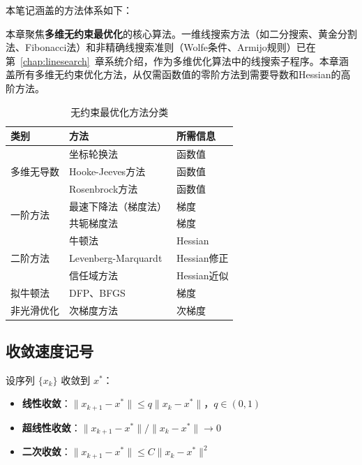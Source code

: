 本笔记涵盖的方法体系如下：

\begin{notebox}[关于方法分类]
本章聚焦\textbf{多维无约束最优化}的核心算法。一维线搜索方法（如二分搜索、黄金分割法、Fibonacci法）和非精确线搜索准则（Wolfe条件、Armijo规则）已在第~\ref{chap:linesearch}~章系统介绍，作为多维优化算法中的线搜索子程序。本章涵盖所有多维无约束优化方法，从仅需函数值的零阶方法到需要导数和Hessian的高阶方法。
\end{notebox}


\begin{table}[H]
\centering
\caption{无约束最优化方法分类}
\begin{tabular}{@{}lll@{}}
\toprule
\textbf{类别} & \textbf{方法} & \textbf{所需信息} \\
\midrule
\multirow{3}{*}{多维无导数}
 & 坐标轮换法 & 函数值 \\
 & Hooke-Jeeves方法 & 函数值 \\
 & Rosenbrock方法 & 函数值 \\
\midrule
\multirow{2}{*}{一阶方法} 
 & 最速下降法（梯度法） & 梯度 \\
 & 共轭梯度法 & 梯度 \\
\midrule
\multirow{3}{*}{二阶方法} 
 & 牛顿法 & Hessian \\
 & Levenberg-Marquardt & Hessian修正 \\
 & 信任域方法 & Hessian近似 \\
\midrule
拟牛顿法 & DFP、BFGS & 梯度 \\
\midrule
非光滑优化 & 次梯度方法 & 次梯度 \\
\bottomrule
\end{tabular}
\end{table}

\subsection{收敛速度记号}

\begin{definition}[收敛速度]
设序列 $\{x_k\}$ 收敛到 $x^*$：
\begin{itemize}
    \item \textbf{线性收敛}：$\|x_{k+1} - x^*\| \leq q \|x_k - x^*\|$，$q \in (0,1)$
    \item \textbf{超线性收敛}：$\|x_{k+1} - x^*\| / \|x_k - x^*\| \to 0$
    \item \textbf{二次收敛}：$\|x_{k+1} - x^*\| \leq C \|x_k - x^*\|^2$
\end{itemize}
\end{definition}

